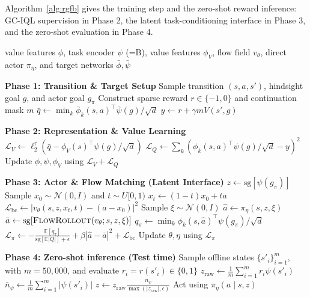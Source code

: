 \documentclass[11pt]{article}
\newcommand{\E}{\mathbb{E}}
\newcommand{\sg}{\mathrm{sg}}
\begin{document}
Algorithm~\ref{alg:rgfb} gives the training step and the zero-shot reward inference: GC-IQL supervision in Phase 2, the latent task-conditioning interface in Phase 3, and the zero-shot evaluation in Phase 4.

\begin{algorithm}[t]
\caption{Bellman-supervised FB-style interface}
\label{alg:rgfb}
\begin{algorithmic}[1]

\Require value features $\phi$, task encoder $\psi$ (=B), value features $\phi_V$, flow field $v_\theta$, direct actor $\pi_\eta$, and target networks $\bar\phi,\bar\psi$

\Statex \textbf{Phase 1: Transition \& Target Setup}
\State Sample transition $(s,a,s')$, hindsight goal $g$, and actor goal $g_\pi$
\State Construct sparse reward $r\in\{-1,0\}$ and continuation mask $m$
\State $\bar q\gets\min_k\bar\phi_k(s,a)^\top\bar\psi(g)/\sqrt d$
\State $y\gets r+\gamma mV(s',g)$ 

\Statex \textbf{Phase 2: Representation \& Value Learning}
\State $\mathcal L_V\gets\ell_2^\tau\left(\bar q-\phi_V(s)^\top\psi(g)/\sqrt d\right)$ 
\State $\mathcal L_Q\gets\sum_k\left(\phi_k(s,a)^\top\psi(g)/\sqrt d-y\right)^2$
\State Update $\phi,\psi,\phi_V$ using $\mathcal L_V+\mathcal L_Q$

\Statex \textbf{Phase 3: Actor \& Flow Matching (Latent Interface)}
\State $z\gets\sg[\psi(g_\pi)]$
\State Sample $x_0\sim\mathcal N(0,I)$ and $t\sim U[0,1)$
\State $x_t\gets(1-t)x_0+ta$
\State $\mathcal L_{\mathrm{bc}}\gets\left|v_\theta(s,z,x_t,t)-(a-x_0)\right|^2$
\State Sample $\xi\sim\mathcal N(0,I)$
\State $\hat a\gets\pi_\eta(s,z,\xi)$
\State $\bar a\gets\sg[\textsc{FlowRollout}(v_\theta;s,z,\xi)]$
\State $q_\pi\gets\min_k\phi_k(s,\hat a)^\top\psi(g_\pi)/\sqrt d$
\State $\mathcal L_\pi\gets-\frac{\E[q_\pi]}{\sg[\E|Q|]+\epsilon}+\beta|\hat a-\bar a|^2+\mathcal L_{\mathrm{bc}}$ 
\State Update $\theta,\eta$ using $\mathcal L_\pi$

\Statex \textbf{Phase 4: Zero-shot inference (Test time)}
\State Sample offline states $\{s'_i\}_{i=1}^m$, with $m=50{,}000$, and evaluate $r_i=r(s'_i)\in\{0,1\}$
\State $z_{\mathrm{raw}}\gets\frac{1}{m}\sum_{i=1}^m r_i\psi(s'_i)$
\State $\bar n_\psi\gets\frac{1}{m}\sum_{i=1}^m|\psi(s'_i)|$
\State $z\gets z_{\mathrm{raw}}\frac{\bar n_\psi}{\max(|z_{\mathrm{raw}}|,\epsilon)}$
\State Act using $\pi_\eta(a\mid s,z)$ 

\end{algorithmic}
\end{algorithm}
\end{document}
